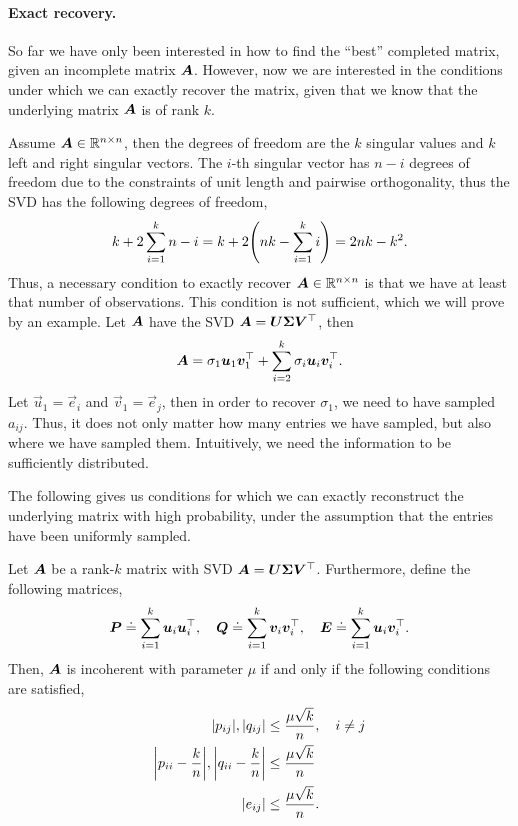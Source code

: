 \paragraph{Exact recovery.}

So far we have only been interested in how to find the ``best'' completed matrix, given an
incomplete matrix $\bm{A}$. However, now we are interested in the conditions under which we can
exactly recover the matrix, given that we know that the underlying matrix $\bm{A}$ is of rank $k$.

Assume $\bm{A} \in \mathbb{R}^{n \times n}$, then the degrees of freedom are the $k$ singular values and
$k$ left and right singular vectors. The $i$-th singular vector has $n-i$ degrees of freedom due to
the constraints of unit length and pairwise orthogonality, thus the SVD has the following degrees
of freedom, \[
    k + 2\sum_{i=1}^{k} n - i = k + 2 \lft( nk - \sum_{i=1}^{k} i \rgt) = 2nk - k^2.
\]
Thus, a necessary condition to exactly recover $\bm{A} \in \mathbb{R}^{n\times n}$ is that we have at
least that number of observations. This condition is not sufficient, which we will prove by an
example. Let $\bm{A}$ have the SVD $\bm{A} = \bm{U} \bm{\Sigma} \bm{V}^\top$, then \[
    \bm{A} = \sigma_1 \bm{u}_1 \bm{v}_1^\top + \sum_{i=2}^{k} \sigma_i \bm{u}_i \bm{v}_i^\top.
\]
Let $\vec{u}_1 = \vec{e}_i$ and $\vec{v}_1 = \vec{e}_j$, then in order to recover $\sigma_1$, we
need to have sampled $a_{ij}$. Thus, it does not only matter how many entries we have sampled, but
also where we have sampled them. Intuitively, we need the information to be sufficiently
distributed.

The following gives us conditions for which we can exactly reconstruct the underlying matrix with
high probability, under the assumption that the entries have been uniformly sampled.

\begin{definition}[Incoherence]
    Let $\bm{A}$ be a rank-$k$ matrix with SVD $\bm{A} = \bm{U} \bm{\Sigma} \bm{V}^\top$.
    Furthermore, define the following matrices, \[
        \bm{P} \doteq \sum_{i=1}^{k} \bm{u}_i \bm{u}_i^\top, \quad \bm{Q} \doteq \sum_{i=1}^{k} \bm{v}_i \bm{v}_i^\top, \quad \bm{E} \doteq \sum_{i=1}^{k} \bm{u}_i \bm{v}_i^\top.
    \]
    Then, $\bm{A}$ is incoherent with parameter $\mu$ if and only if the following conditions are
    satisfied,
    \begin{align*}
        |p_{ij}|, |q_{ij}|                                                 & \leq \frac{\mu \sqrt{k}}{n}, \quad i \neq j \\
        \lft| p_{ii} - \frac{k}{n} \rgt|, \lft| q_{ii} - \frac{k}{n} \rgt| & \leq \frac{\mu \sqrt{k}}{n}                 \\
        |e_{ij}|                                                           & \leq \frac{\mu \sqrt{k}}{n}.
    \end{align*}
\end{definition}

